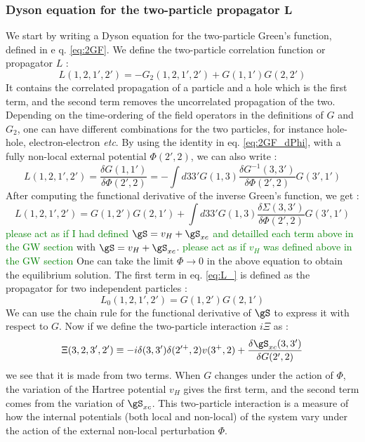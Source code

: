 \subsubsection{Dyson equation for the two-particle propagator $\mathbf{L}$}
We start by writing a Dyson equation for the two-particle Green's function, defined in e q. \eqref{eq:2GF}.  We define the two-particle correlation function or propagator $L$ :
\begin{equation}
	L(1,2,1',2') = - G_2(1,2,1',2') + G(1,1')G(2,2') \label{eq:L}
\end{equation}
It contains the correlated propagation of a particle and a hole which is the first term, and the second term removes the uncorrelated propagation of the two. Depending on the time-ordering of the field operators in the definitions of $G$ and $G_2$, one can have different combinations for the two particles, for instance hole-hole, electron-electron \textit{etc}.
By using the identity in eq. \eqref{eq:2GF_dPhi}, with a fully non-local external potential $\Phi(2',2)$, we can also write :
\begin{equation}
	L(1,2,1',2') = \frac{\delta G(1,1')}{\delta \Phi(2',2)} = -\int d33' G(1,3)\frac{\delta G^{-1}(3,3')}{\delta\Phi(2',2)}G(3',1')
\end{equation}
After computing the functional derivative of the inverse Green's function, we get :
\begin{equation}
	L(1,2,1',2') = G(1,2')G(2,1') + \int d33' G(1,3) \frac{\delta \Sigma(3,3')}{\delta \Phi(2',2)} G(3',1') \label{eq:L_}
\end{equation}
\textcolor{green}{please act as if I had defined $\gS = v_H + \gS_{xc}$ and detailled each term above in the GW section} with $\gS = v_H + \gS_{xc}$.  \textcolor{green}{please act as if $v_H$ was defined above in the GW section} One can take the limit $\Phi \to 0$ in the above equation to obtain the equilibrium solution. The first term in eq. \eqref{eq:L_} is defined as the propagator for two independent particles :
\begin{equation}
	L_0(1,2,1',2') = G(1,2') G(2,1') 
\end{equation}
We can use the chain rule for the functional derivative of $\gS$ to express it with respect to $G$. Now if we define the two-particle interaction $i\Xi$ as :
\begin{equation}
	\Xi(3,2,3',2') \equiv -i \delta(3,3')\delta(2'^+,2)v(3^+,2) + \frac{\delta \gS_{xc}(3,3')}{\delta G(2',2)}
\end{equation}
we see that it is made from two terms. When $G$ changes under the action of $\Phi$, the variation of the Hartree potential $v_H$ gives the first term, and the second term comes from the variation of $\gS_{xc}$. This two-particle interaction is a measure of how the internal potentials (both local and non-local) of the system vary under the action of the external non-local perturbation $\Phi$.
